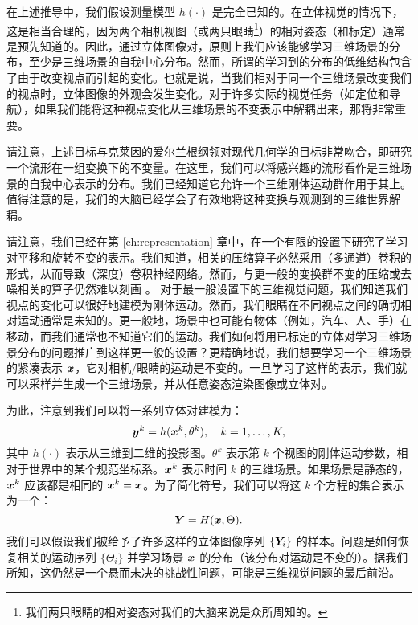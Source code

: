 \documentclass[../../book-main_zh.tex]{subfiles}
\begin{document}
在上述推导中，我们假设测量模型 $h(\cdot)$ 是完全已知的。在立体视觉的情况下，这是相当合理的，因为两个相机视图（或两只眼睛\footnote{我们两只眼睛的相对姿态对我们的大脑来说是众所周知的。}）的相对姿态（和标定）通常是预先知道的。因此，通过立体图像对，原则上我们应该能够学习三维场景的分布，至少是三维场景的自我中心分布。然而，所谓的学习到的分布的低维结构包含了由于改变视点而引起的变化。也就是说，当我们相对于同一个三维场景改变我们的视点时，立体图像的外观会发生变化。对于许多实际的视觉任务（如定位和导航），如果我们能将这种视点变化从三维场景的不变表示中解耦出来，那将非常重要。

\begin{remark}请注意，上述目标与克莱因的爱尔兰根纲领对现代几何学的目标非常吻合，即研究一个流形在一组变换下的不变量。在这里，我们可以将感兴趣的流形看作是三维场景的自我中心表示的分布。我们已经知道它允许一个三维刚体运动群作用于其上。值得注意的是，我们的大脑已经学会了有效地将这种变换与观测到的三维世界解耦。
\end{remark}


请注意，我们已经在第 \ref{ch:representation} 章中，在一个有限的设置下研究了学习对平移和旋转不变的表示。我们知道，相关的压缩算子必然采用（多通道）卷积的形式，从而导致（深度）卷积神经网络。然而，与更一般的变换群不变的压缩或去噪相关的算子仍然难以刻画 \cite{cohen2016group}。
对于最一般设置下的三维视觉问题，我们知道我们视点的变化可以很好地建模为刚体运动。然而，我们眼睛在不同视点之间的确切相对运动通常是未知的。更一般地，场景中也可能有物体（例如，汽车、人、手）在移动，而我们通常也不知道它们的运动。我们如何将用已标定的立体对学习三维场景分布的问题推广到这样更一般的设置？更精确地说，我们想要学习一个三维场景的紧凑表示 $\bm{x}$，它对相机/眼睛的运动是不变的。一旦学习了这样的表示，我们就可以采样并生成一个三维场景，并从任意姿态渲染图像或立体对。


为此，注意到我们可以将一系列立体对建模为：
\begin{equation}
    \bm{y}^k = h(\bm{x}^k, \theta^k), \quad k=1, \ldots, K,
\end{equation}
其中 $h(\cdot)$ 表示从三维到二维的投影图。$\theta^k$ 表示第 $k$ 个视图的刚体运动参数，相对于世界中的某个规范坐标系。$\bm{x}^k$ 表示时间 $k$ 的三维场景。如果场景是静态的，$\bm{x}^k$ 应该都是相同的 $\bm{x}^k = \bm{x}$。为了简化符号，我们可以将这 $k$ 个方程的集合表示为一个：
\begin{equation}
    \bm{Y} = H(\bm{x},\Theta). 
\end{equation}
我们可以假设我们被给予了许多这样的立体图像序列 $\{\bm{Y}_i\}$ 的样本。问题是如何恢复相关的运动序列 $\{\Theta_i\}$ 并学习场景 $\bm{x}$ 的分布（该分布对运动是不变的）。据我们所知，这仍然是一个悬而未决的挑战性问题，可能是三维视觉问题的最后前沿。
\end{document}
